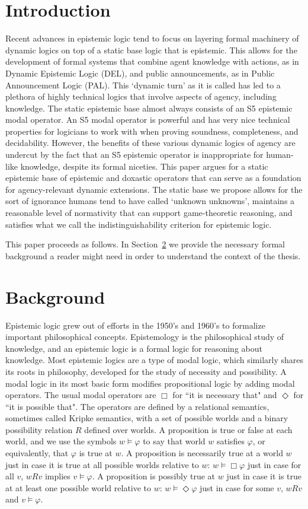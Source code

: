 \section{Introduction}
\label{intro}
Recent advances in epistemic logic  tend to focus on layering formal machinery of dynamic logics on top of a static base logic that is epistemic. This allows for the development of formal systems that combine agent knowledge with actions, as in Dynamic Epistemic Logic (DEL), and public announcements, as in Public Announcement Logic (PAL). This `dynamic turn' as it is called has led to a plethora of highly technical logics that involve aspects of agency, including knowledge. The static epistemic base almost always consists of an S5 epistemic modal operator. An S5 modal operator is powerful and has very nice technical properties for logicians to work with when proving soundness, completeness, and decidability. However, the benefits of these various dynamic logics of agency are undercut by the fact that an S5 epistemic operator is inappropriate for human-like knowledge, despite its formal niceties. This paper argues for a static epistemic base of epistemic and doxastic operators that can serve as a foundation for agency-relevant dynamic extensions. The static base we propose allows for the sort of ignorance humans tend to have called `unknown unknowns', maintains a reasonable level of normativity that can support game-theoretic reasoning, and satisfies what we call the indistinguishability criterion for epistemic logic.

This paper proceeds as follows. In Section~\ref{sec:background} we provide the necessary formal background a reader might need in order to understand the context of the thesis.
\section{Background}
\label{sec:background}
Epistemic logic grew out of efforts in the 1950's and 1960's to formalize important philosophical concepts. Epistemology is the philosophical study of knowledge, and an epistemic logic is a formal logic for reasoning about knowledge. Most epistemic logics are a type of modal logic, which similarly shares its roots in philosophy, developed for the study of necessity and possibility. A modal logic in its most basic form modifies propositional logic by adding modal operators. The usual modal operators are $\Box$ for ``it is necessary that" and $\Diamond$ for ``it is possible that". The operators are defined by a relational semantics, sometimes called Kripke semantics, with a set of possible worlds and a binary possibility relation $R$ defined over worlds. A proposition is true or false at each world, and we use the symbols $w\models\varphi$ to say that world $w$ satisfies $\varphi$, or equivalently, that $\varphi$ is true at $w$. A proposition is necessarily true at a world $w$ just in case it is true at all possible worlds relative to $w$: $w\models \Box\varphi$ just in case for all $v$, $wRv$ implies $v\models\varphi$. A proposition is possibly true at $w$ just in case it is true at at least one possible world relative to $w$: $w\models\Diamond \varphi$ just in case for some $v$, $wRv$ and $v\models\varphi$.

